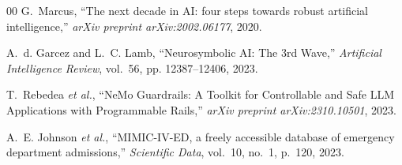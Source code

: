 \documentclass[conference]{IEEEtran}
\begin{document}
\begin{thebibliography}{00}
G.~Marcus, ``The next decade in AI: four steps towards robust artificial intelligence,'' \emph{arXiv preprint arXiv:2002.06177}, 2020.

A.~d. Garcez and L.~C. Lamb, ``Neurosymbolic AI: The 3rd Wave,'' \emph{Artificial Intelligence Review}, vol.~56, pp. 12387--12406, 2023.

T.~Rebedea \emph{et al.}, ``NeMo Guardrails: A Toolkit for Controllable and Safe LLM Applications with Programmable Rails,'' \emph{arXiv preprint arXiv:2310.10501}, 2023.

A.~E. Johnson \emph{et al.}, ``MIMIC-IV-ED, a freely accessible database of emergency department admissions,'' \emph{Scientific Data}, vol.~10, no.~1, p.~120, 2023.

\end{thebibliography}
\end{document}
